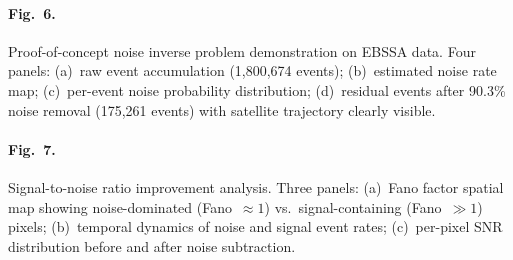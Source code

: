 \documentclass[twocolumn]{article}
\begin{document}
\paragraph{Fig.~6.}
Proof-of-concept noise inverse problem demonstration on EBSSA data.
Four panels: (a)~raw event accumulation (1,800,674 events); (b)~estimated noise rate map; (c)~per-event noise probability distribution; (d)~residual events after 90.3\% noise removal (175,261 events) with satellite trajectory clearly visible.
\label{fig:demo}

\paragraph{Fig.~7.}
Signal-to-noise ratio improvement analysis.
Three panels: (a)~Fano factor spatial map showing noise-dominated (Fano~$\approx 1$) vs.\ signal-containing (Fano~$\gg 1$) pixels; (b)~temporal dynamics of noise and signal event rates; (c)~per-pixel SNR distribution before and after noise subtraction.
\label{fig:snr}
\end{document}
